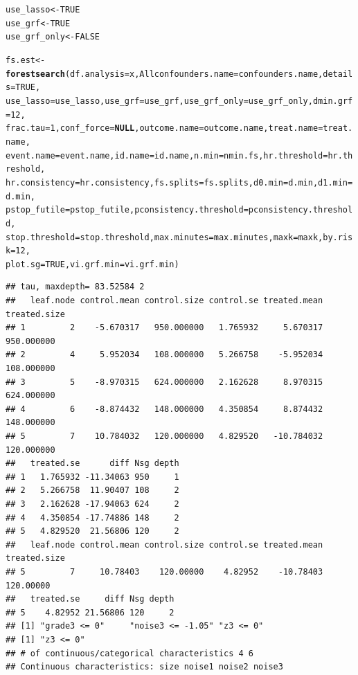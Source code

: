 \documentclass[smallextended]{svjour3}
\makeatletter
\newcommand{\hlnum}[1]{\textcolor[rgb]{0.686,0.059,0.569}{#1}}%
\newcommand{\hlstd}[1]{\textcolor[rgb]{0.345,0.345,0.345}{#1}}%
\newcommand{\hlkwa}[1]{\textcolor[rgb]{0.161,0.373,0.58}{\textbf{#1}}}%
\newcommand{\hlkwb}[1]{\textcolor[rgb]{0.69,0.353,0.396}{#1}}%
\newcommand{\hlkwc}[1]{\textcolor[rgb]{0.333,0.667,0.333}{#1}}%
\newcommand{\hlkwd}[1]{\textcolor[rgb]{0.737,0.353,0.396}{\textbf{#1}}}%
\newenvironment{kframe}{%
 \def\at@end@of@kframe{}%
 \ifinner\ifhmode%
  \def\at@end@of@kframe{\end{minipage}}%
  \begin{minipage}{\columnwidth}%
 \fi\fi%
 \def\FrameCommand##1{\hskip\@totalleftmargin \hskip-\fboxsep
 \colorbox{shadecolor}{##1}\hskip-\fboxsep
     \hskip-\linewidth \hskip-\@totalleftmargin \hskip\columnwidth}%
 \MakeFramed {\advance\hsize-\width
   \@totalleftmargin\z@ \linewidth\hsize
   \@setminipage}}%
 {\par\unskip\endMakeFramed%
 \at@end@of@kframe}
\newenvironment{knitrout}{}{} %
\makeatother
\begin{document}
\begin{knitrout}
\begin{kframe}
\begin{alltt}
\hlstd{use_lasso} \hlkwb{<-} \hlnum{TRUE}
\hlstd{use_grf} \hlkwb{<-} \hlnum{TRUE}
\hlstd{use_grf_only} \hlkwb{<-} \hlnum{FALSE}

\hlstd{fs.est} \hlkwb{<-} \hlkwd{forestsearch}\hlstd{(}\hlkwc{df.analysis} \hlstd{= x,} \hlkwc{Allconfounders.name} \hlstd{= confounders.name,} \hlkwc{details} \hlstd{=} \hlnum{TRUE}\hlstd{,}
    \hlkwc{use_lasso} \hlstd{= use_lasso,} \hlkwc{use_grf} \hlstd{= use_grf,} \hlkwc{use_grf_only} \hlstd{= use_grf_only,} \hlkwc{dmin.grf} \hlstd{=} \hlnum{12}\hlstd{,}
    \hlkwc{frac.tau} \hlstd{=} \hlnum{1}\hlstd{,} \hlkwc{conf_force} \hlstd{=} \hlkwa{NULL}\hlstd{,} \hlkwc{outcome.name} \hlstd{= outcome.name,} \hlkwc{treat.name} \hlstd{= treat.name,}
    \hlkwc{event.name} \hlstd{= event.name,} \hlkwc{id.name} \hlstd{= id.name,} \hlkwc{n.min} \hlstd{= nmin.fs,} \hlkwc{hr.threshold} \hlstd{= hr.threshold,}
    \hlkwc{hr.consistency} \hlstd{= hr.consistency,} \hlkwc{fs.splits} \hlstd{= fs.splits,} \hlkwc{d0.min} \hlstd{= d.min,} \hlkwc{d1.min} \hlstd{= d.min,}
    \hlkwc{pstop_futile} \hlstd{= pstop_futile,} \hlkwc{pconsistency.threshold} \hlstd{= pconsistency.threshold,}
    \hlkwc{stop.threshold} \hlstd{= stop.threshold,} \hlkwc{max.minutes} \hlstd{= max.minutes,} \hlkwc{maxk} \hlstd{= maxk,} \hlkwc{by.risk} \hlstd{=} \hlnum{12}\hlstd{,}
    \hlkwc{plot.sg} \hlstd{=} \hlnum{TRUE}\hlstd{,} \hlkwc{vi.grf.min} \hlstd{= vi.grf.min)}
\end{alltt}
\begin{verbatim}
## tau, maxdepth= 83.52584 2 
##   leaf.node control.mean control.size control.se treated.mean treated.size
## 1         2    -5.670317   950.000000   1.765932     5.670317   950.000000
## 2         4     5.952034   108.000000   5.266758    -5.952034   108.000000
## 3         5    -8.970315   624.000000   2.162628     8.970315   624.000000
## 4         6    -8.874432   148.000000   4.350854     8.874432   148.000000
## 5         7    10.784032   120.000000   4.829520   -10.784032   120.000000
##   treated.se      diff Nsg depth
## 1   1.765932 -11.34063 950     1
## 2   5.266758  11.90407 108     2
## 3   2.162628 -17.94063 624     2
## 4   4.350854 -17.74886 148     2
## 5   4.829520  21.56806 120     2
##   leaf.node control.mean control.size control.se treated.mean treated.size
## 5         7     10.78403    120.00000    4.82952    -10.78403    120.00000
##   treated.se     diff Nsg depth
## 5    4.82952 21.56806 120     2
## [1] "grade3 <= 0"     "noise3 <= -1.05" "z3 <= 0"        
## [1] "z3 <= 0"
## # of continuous/categorical characteristics 4 6 
## Continuous characteristics: size noise1 noise2 noise3 

\end{verbatim}
\end{kframe}
\end{knitrout}
\end{document}
